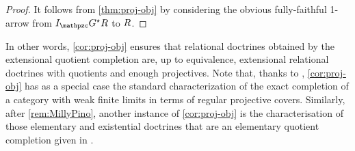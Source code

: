 \begin{proof}
It follows from \cref{thm:proj-obj} by considering the obvious fully-faithful 1-arrow from $I_\ct{G}^\star\RDoc$ to $R$. 
\end{proof}

In other words, \cref{cor:proj-obj} ensures that 
relational doctrines obtained by the extensional quotient completion are, up to equivalence, extensional relational doctrines with quotients and enough projectives. 
% 
 Note that, thanks to , \cref{cor:proj-obj} has as a special case 
the standard characterization of the exact completion of a category with weak finite limits in terms of regular projective covers.  Similarly, after \cref{rem:MillyPino}, another instance of \cref{cor:proj-obj} is the characterisation of those elementary and existential doctrines that are an elementary quotient completion given in \cite{MaiettiPR24}.

